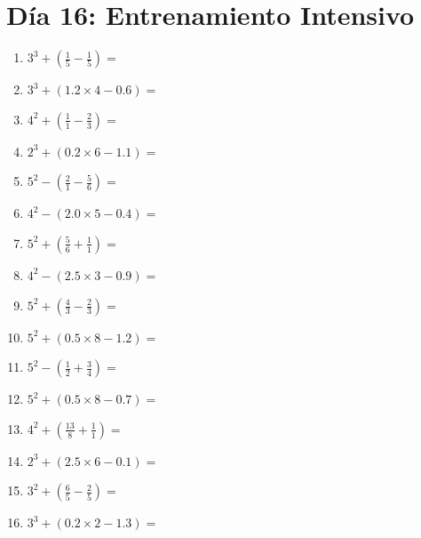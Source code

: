 \documentclass[12pt]{article}
\begin{document}
\section*{Día 16: Entrenamiento Intensivo}
\begin{enumerate}
\item \large $ 3^{3} + (\frac{1}{5} - \frac{1}{5}) = $ \vspace{1.6cm}
\item \large $ 3^{3} + (1.2 \times 4 - 0.6) = $ \vspace{1.6cm}
\item \large $ 4^{2} + (\frac{1}{1} - \frac{2}{3}) = $ \vspace{1.6cm}
\item \large $ 2^{3} + (0.2 \times 6 - 1.1) = $ \vspace{1.6cm}
\item \large $ 5^{2} - (\frac{2}{1} - \frac{5}{6}) = $ \vspace{1.6cm}
\item \large $ 4^{2} - (2.0 \times 5 - 0.4) = $ \vspace{1.6cm}
\item \large $ 5^{2} + (\frac{5}{6} + \frac{1}{1}) = $ \vspace{1.6cm}
\item \large $ 4^{2} - (2.5 \times 3 - 0.9) = $ \vspace{1.6cm}
\item \large $ 5^{2} + (\frac{4}{3} - \frac{2}{3}) = $ \vspace{1.6cm}
\item \large $ 5^{2} + (0.5 \times 8 - 1.2) = $ \vspace{1.6cm}
\newpage
\item \large $ 5^{2} - (\frac{1}{2} + \frac{3}{4}) = $ \vspace{1.6cm}
\item \large $ 5^{2} + (0.5 \times 8 - 0.7) = $ \vspace{1.6cm}
\item \large $ 4^{2} + (\frac{13}{8} + \frac{1}{1}) = $ \vspace{1.6cm}
\item \large $ 2^{3} + (2.5 \times 6 - 0.1) = $ \vspace{1.6cm}
\item \large $ 3^{2} + (\frac{6}{5} - \frac{2}{5}) = $ \vspace{1.6cm}
\item \large $ 3^{3} + (0.2 \times 2 - 1.3) = $ \vspace{1.6cm}

\end{enumerate}
\end{document}
